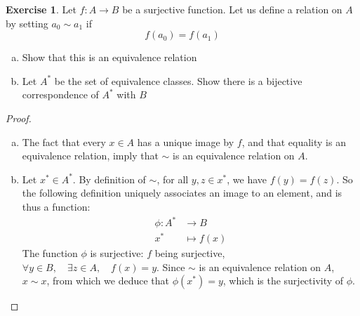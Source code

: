 \documentclass[11pt,a4paper,twoside]{article}
\theoremstyle{definition}
\newcounter{excounter}
\newtheorem{exercise}[excounter]{Exercise}
\begin{document}
\begin{exercise}

  Let $f : A \to B$ be a surjective function. Let us define a relation on $A$ by setting
  $a_0 \sim a_1$ if
  \begin{equation*}
    f (a_0) = f (a_1)
  \end{equation*}
  \begin{enumerate}[(a)]
  \item Show that this is an equivalence relation
  \item Let $A^*$ be the set of equivalence classes. Show there is a bijective correspondence of $A^*$ with $B$
  \end{enumerate}

\end{exercise}

\begin{proof}\hfill

  \begin{enumerate}[(a)]
  \item The fact that every $x \in A$ has a unique image by $f$, and that equality is an equivalence relation, imply that $\sim$ is an equivalence relation on $A$.
  \item Let $x^* \in A^*$. By definition of $\sim$, for all $y, z \in x^*$, we have $f (y) = f (z)$. So the following definition uniquely associates an image to an element,
    and is thus a function:
    \begin{align*}
      \phi : A^* &\to B \\
      x^* &\mapsto f (x)
    \end{align*}
    The function $\phi$ is surjective: $f$ being surjective, $\forall y \in B, \quad \exists z \in A, \quad f (x) = y$. Since $\sim$ is an equivalence relation on $A$,
   $x \sim x$, from which we deduce that $\phi (x^*) = y$, which is the surjectivity of $\phi$.
  \end{enumerate}

\end{proof}
\end{document}
